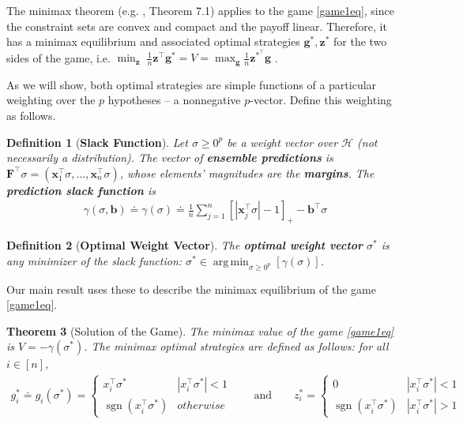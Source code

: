 \documentclass{colt2015} %
\newtheorem{thm}{Theorem}%
\newtheorem{defn}[thm]{Definition}
\newcommand{\vF}{\mathbf{F}}
\newcommand{\vx}{\mathbf{x}}
\newcommand{\vb}{\mathbf{b}}
\newcommand{\vg}{\mathbf{g}}
\newcommand{\vz}{\mathbf{z}}
\DeclareMathOperator*{\argmin}{arg\,min}
\DeclareMathOperator{\sgn}{sgn}
\newcommand{\abs}[1]{\left| #1 \right|}
\newcommand{\cH}{\mathcal{H}}
\begin{document}
The minimax theorem (e.g. \cite{CBL06}, Theorem 7.1) applies to the game \eqref{game1eq}, 
since the constraint sets are convex and compact and the payoff linear. 
Therefore, it has a minimax equilibrium and associated optimal 
strategies $\vg^*, \vz^*$ for the two sides of the game, i.e. 
$\min_{\vz}\; \frac{1}{n} \vz^\top \vg^* = V = \max_{\vg} \frac{1}{n} \vz^{*^\top} \vg$ .

As we will show, both optimal strategies are simple functions of a
particular weighting over the $p$ hypotheses -- a nonnegative $p$-vector. 
Define this weighting as follows.
\begin{defn}[\textbf{Slack Function}]
Let $\sigma \geq 0^p$ be a weight vector over $\cH$ (not necessarily a distribution).
The vector of \textbf{ensemble predictions} is
$\vF^\top \sigma = (\vx_1^\top \sigma, \dots, \vx_n^\top \sigma)$, 
whose elements' magnitudes are the \textbf{margins}. 
The \textbf{prediction slack function} is
\begin{align}
\label{eqn:slack}
\gamma (\sigma, \vb) \doteq \gamma (\sigma) \doteq \frac{1}{n} \sum_{j=1}^n \left[ \abs{\vx_{j}^\top \sigma} - 1 \right]_{+} - \vb^\top \sigma
\end{align}
\end{defn}
\begin{defn}[\textbf{Optimal Weight Vector}]
The \textbf{optimal weight vector} $\sigma^*$ is any minimizer of the slack function: 
$\displaystyle \sigma^* \in \argmin_{\sigma \geq 0^p} \left[ \gamma (\sigma) \right]$.
\end{defn}

Our main result uses these to describe the minimax equilibrium of the game \eqref{game1eq}.
\begin{thm}[Solution of the Game]
\label{thm:gamesolngen}
The minimax value of the game \eqref{game1eq} is 
$V = - \gamma (\sigma^*)$. 
The minimax optimal strategies are defined as follows:
for all $i \in [n]$,
\begin{align}
g_i^* \doteq g_i (\sigma^*) = \begin{cases} x_{i}^\top \sigma^* & \abs{x_{i}^\top \sigma^*} < 1 \\ 
\sgn(x_{i}^\top \sigma^*) & otherwise \end{cases}
\quad \quad \text{and} \quad \quad
z_i^* = 
\begin{cases} 
0 & \abs{x_{i}^\top \sigma^*} < 1 \\ 
\sgn(x_{i}^\top \sigma^*) & \abs{x_{i}^\top \sigma^*} > 1 
\end{cases}
\label{eqn:opt-strats}
\end{align}
\end{thm}
\end{document}
